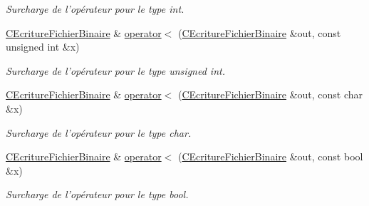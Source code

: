 \begin{DoxyCompactItemize}
\begin{DoxyCompactList}\small\item\em Surcharge de l'opérateur pour le type {\itshape int}. \end{DoxyCompactList}\item 
\hypertarget{class_c_ecriture_fichier_binaire_a38d0f050dcc8a79522b0fb9b9c591f72}{\hyperlink{class_c_ecriture_fichier_binaire}{C\-Ecriture\-Fichier\-Binaire} \& \hyperlink{class_c_ecriture_fichier_binaire_a38d0f050dcc8a79522b0fb9b9c591f72}{operator$<$} (\hyperlink{class_c_ecriture_fichier_binaire}{C\-Ecriture\-Fichier\-Binaire} \&out, const unsigned int \&x)}\label{class_c_ecriture_fichier_binaire_a38d0f050dcc8a79522b0fb9b9c591f72}

\begin{DoxyCompactList}\small\item\em Surcharge de l'opérateur pour le type {\itshape unsigned} {\itshape int}. \end{DoxyCompactList}\item 
\hypertarget{class_c_ecriture_fichier_binaire_a3cb25116e2558d967dfd21e812e47a3e}{\hyperlink{class_c_ecriture_fichier_binaire}{C\-Ecriture\-Fichier\-Binaire} \& \hyperlink{class_c_ecriture_fichier_binaire_a3cb25116e2558d967dfd21e812e47a3e}{operator$<$} (\hyperlink{class_c_ecriture_fichier_binaire}{C\-Ecriture\-Fichier\-Binaire} \&out, const char \&x)}\label{class_c_ecriture_fichier_binaire_a3cb25116e2558d967dfd21e812e47a3e}

\begin{DoxyCompactList}\small\item\em Surcharge de l'opérateur pour le type {\itshape char}. \end{DoxyCompactList}\item 
\hypertarget{class_c_ecriture_fichier_binaire_a37080aca11f391be69941db70093f77d}{\hyperlink{class_c_ecriture_fichier_binaire}{C\-Ecriture\-Fichier\-Binaire} \& \hyperlink{class_c_ecriture_fichier_binaire_a37080aca11f391be69941db70093f77d}{operator$<$} (\hyperlink{class_c_ecriture_fichier_binaire}{C\-Ecriture\-Fichier\-Binaire} \&out, const bool \&x)}\label{class_c_ecriture_fichier_binaire_a37080aca11f391be69941db70093f77d}

\begin{DoxyCompactList}\small\item\em Surcharge de l'opérateur pour le type {\itshape bool}. \end{DoxyCompactList}\end{DoxyCompactItemize}


